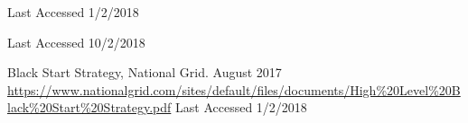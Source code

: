 \begin{thebibliography}{9}
Last Accessed 1/2/2018


Last Accessed 10/2/2018

                
Black Start Strategy, National Grid.
August 2017
\url{https://www.nationalgrid.com/sites/default/files/documents/High%20Level%20Black%20Start%20Strategy.pdf}
Last Accessed 1/2/2018

\end{thebibliography}


